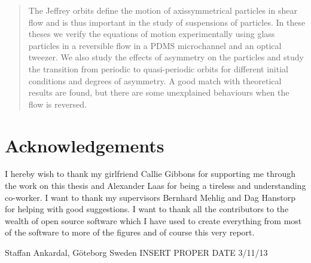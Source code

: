 \begin{abstract}
The Jeffrey orbits define the motion of axissymmetrical particles in shear flow and is thus important in the study of suspensions of particles. In these theses we verify the equations of motion experimentally using glass particles in a reversible flow in a PDMS microchannel and an optical tweezer. We also study the effects of asymmetry on the particles and study the transition from periodic to quasi-periodic orbits for different initial conditions and degrees of asymmetry. A good match with theoretical results are found, but there are some unexplained behaviours when the  flow is reversed.
\end{abstract}


\newpage
\clearpage
\mbox{}
\thispagestyle{empty}
\section*{Acknowledgements}
I hereby wish to thank my girlfriend Callie Gibbons for supporting me through the work on this thesis and Alexander Laas for being a tireless and understanding co-worker. I want to thank my supervisors Bernhard Mehlig and Dag Hanstorp for helping with good suggestions. I want to thank all the contributors to the wealth of open source software which I have used to create everything from most of the software to more of the figures and of course this very report. 

\hfill Staffan Ankardal, Göteborg Sweden INSERT PROPER DATE 3/11/13

